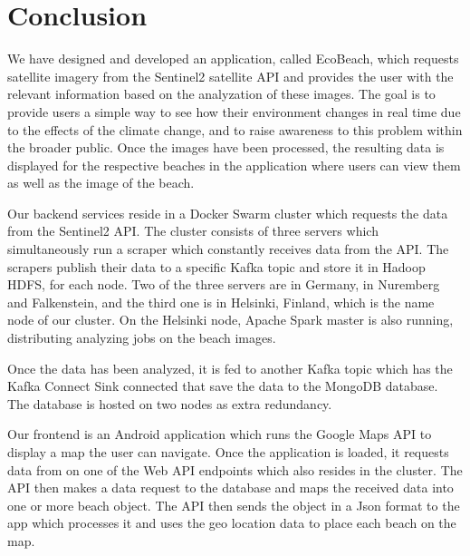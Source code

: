 \chapter{Conclusion}

We have designed and developed an application, called EcoBeach, which requests satellite imagery from the Sentinel2 satellite API and provides the user with the relevant information based on the analyzation of these images. The goal is to provide users a simple way to see how their environment changes in real time due to the effects of the climate change, and to raise awareness to this problem within the broader public. Once the images have been processed, the resulting data is displayed for the respective beaches in the application where users can view them as well as the image of the beach.

Our backend services reside in a Docker Swarm cluster which requests the data from the Sentinel2 API. The cluster consists of three servers which simultaneously run a scraper which constantly receives data from the API. The scrapers publish their data to a specific Kafka topic and store it in Hadoop HDFS, for each node. Two of the three servers are in Germany, in Nuremberg and Falkenstein, and the third one is in Helsinki, Finland, which is the name node of our cluster. On the Helsinki node, Apache Spark master is also running, distributing analyzing jobs on the beach images. 

Once the data has been analyzed, it is fed to another Kafka topic which has the Kafka Connect Sink connected that save the data to the MongoDB database. The database is hosted on two nodes as extra redundancy.

Our frontend is an Android application which runs the Google Maps API to display a map the user can navigate. Once the application is loaded, it requests data from on one of the Web API endpoints which also resides in the cluster. The API then makes a data request to the database and maps the received data into one or more beach object. The API then sends the object in a Json format to the app which processes it and uses the geo location data to place each beach on the map.
